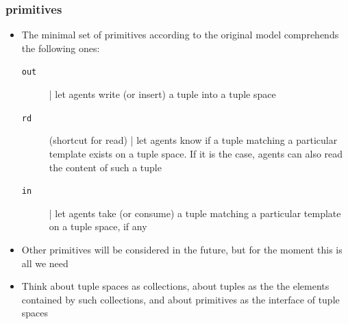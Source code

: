 \documentclass[presentation]{beamer}\mode<presentation>{\usetheme{AMSCesenaPurpleAndGold}}
\begin{document}
\begin{frame}%
\frametitle{ primitives}
	\begin{itemize}
		\item The minimal set of \alert{primitives} according to the original  model comprehends the following ones:
		\begin{description}
			\item[\texttt{out}] | let agents \alert{write} (or \alert{insert}) a tuple into a tuple space

			\item[\texttt{rd}] (shortcut for \alert{read}) | let agents know if a tuple matching a particular template \alert{exists} on a tuple space.
			If it is the case, agents can also read the content of such a tuple

			\item[\texttt{in}] | let agents \alert{take} (or \alert{consume}) a tuple matching a particular template on a tuple space, if any
		\end{description}

		\item Other primitives will be considered in the future, but for the moment this is all we need

		\item Think about tuple spaces as \alert{collections}, about tuples as the the elements contained by such collections, and about primitives as the \alert{interface} of tuple spaces
	\end{itemize}
\end{frame}

\end{document}
